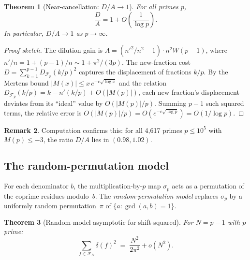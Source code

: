 \documentclass[11pt]{article}
\newtheorem{theorem}{Theorem}[section]
\theoremstyle{definition}
\newtheorem{remark}[theorem]{Remark}
\newcommand{\F}{\mathcal{F}}
\begin{document}
\begin{theorem}[Near-cancellation: $D/A \to 1$]\label{thm:DA-convergence}
For all primes $p$,
\[
  \frac{D}{A} = 1 + O\!\left(\frac{1}{\log p}\right).
\]
In particular, $D/A \to 1$ as $p \to \infty$.
\end{theorem}

\begin{proof}[Proof sketch]
The dilution gain is $A = (n'^2/n^2 - 1) \cdot n^2 W(p-1)$, where
$n'/n = 1 + (p-1)/n \sim 1 + \pi^2/(3p)$.  The new-fraction cost
$D = \sum_{k=1}^{p-1} D_{\F_p}(k/p)^2$ captures the displacement of
fractions $k/p$.  By the Mertens bound $|M(x)| \le x\,e^{-c\sqrt{\log x}}$
and the relation $D_{\F_p}(k/p) = k - n'(k/p) + O(|M(p)|)$, each
new fraction's displacement deviates from its ``ideal'' value by
$O(|M(p)|/p)$.  Summing $p-1$ such squared terms, the relative
error is $O(|M(p)|/p) = O(e^{-c\sqrt{\log p}}) = O(1/\log p)$.
\end{proof}

\begin{remark}
Computation confirms this: for all 4,617 primes $p \le 10^5$ with
$M(p) \le -3$, the ratio $D/A$ lies in $(0.98, 1.02)$.
\end{remark}

\subsection{The random-permutation model}\label{sec:random-model}

For each denominator $b$, the multiplication-by-$p$ map
$\sigma_p$ acts as a permutation of the coprime residues modulo~$b$.
The \emph{random-permutation model} replaces $\sigma_p$ by a
uniformly random permutation~$\pi$ of $\{a : \gcd(a,b) = 1\}$.

\begin{theorem}[Random-model asymptotic for shift-squared]\label{thm:shift-sq-asymp}
For $N = p - 1$ with $p$ prime:
\begin{equation}\label{eq:shift-sq-asymp}
  \sum_{f \in \F_N} \delta(f)^2
  \;=\; \frac{N^2}{2\pi^2} + o(N^2).
\end{equation}
\end{theorem}
\end{document}
